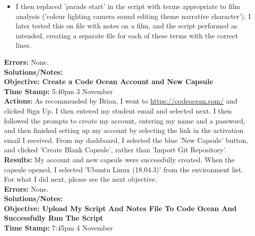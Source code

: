 \documentclass{article}
\begin{document}
\begin{FlushLeft}
\begin{itemize}
    \item I then replaced 'parade start' in the script with terms appropriate to film analysis ('colour lighting camera sound editing theme narrative character'). I later tested this on file with notes on a film, and the script performed as intended, creating a separate file for each of these terms with the correct lines.
\end{itemize}
\textbf{Errors:} None.\\
\textbf{Solutions/Notes:}\\
\vspace{5mm}
\textbf{Objective: Create a Code Ocean Account and New Capsule}\\
\textbf{Time Stamp:} 5:40pm 3 November\\
\textbf{Actions:} As recommended by Brian, I went to \url{https://codeocean.com/} and clicked Sign Up. I then entered my student email and selected next. I then followed the prompts to create my account, entering my name and a password, and then finished setting up my account by selecting the link in the activation email I received. From my dashboard, I selected the blue 'New Capsule' button, and clicked 'Create Blank Capsule', rather than 'Import Git Repository'.\\
\textbf{Results:} My account and new capsule were successfully created. When the capsule opened, I selected 'Ubuntu Linux (18.04.3)' from the environment list. For what I did next, please see the next objective.\\
\textbf{Errors:} None.\\
\textbf{Solutions/Notes:}\\
\vspace{5mm}
\textbf{Objective: Upload My Script And Notes File To Code Ocean And Successfully Run The Script}\\
\textbf{Time Stamp:} 7:45pm 4 November\\

\end{FlushLeft}
\end{document}
